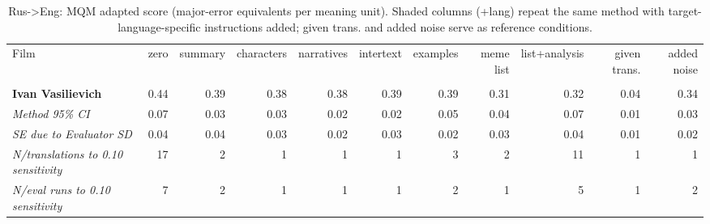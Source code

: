 \begin{table}[ht]
\centering
\begin{adjustbox}{width=\textwidth}
\begin{tabular}{lrrrrrrrr|rr}
Film & zero & summary & characters & narratives & intertext & examples & meme list & list+analysis & \multicolumn{1}{|r}{given trans.} & added noise \\
 &  &  &  &  &  &  &  &  &  &  \\
\hline
\textbf{Ivan Vasilievich} & 0.44 & 0.39 & 0.38 & 0.38 & 0.39 & 0.39 & 0.31 & 0.32 & 0.04 & 0.34 \\

\emph{Method 95\% CI} & 0.07 & 0.03 & 0.03 & 0.02 & 0.02 & 0.05 & 0.04 & 0.07 & 0.01 & 0.03 \\

\emph{SE due to Evaluator SD} & 0.04 & 0.04 & 0.03 & 0.02 & 0.03 & 0.02 & 0.03 & 0.04 & 0.01 & 0.02 \\

\emph{N/translations to 0.10 sensitivity} & 17 & 2 & 1 & 1 & 1 & 3 & 2 & 11 & 1 & 1 \\

\emph{N/eval runs to 0.10 sensitivity} & 7 & 2 & 1 & 1 & 1 & 2 & 1 & 5 & 1 & 2 \\

\hline
\end{tabular}
\end{adjustbox}
\caption{Rus->Eng: MQM adapted score (major-error equivalents per meaning unit). Shaded columns (+lang) repeat the same method with target-language-specific instructions added; given trans. and added noise serve as reference conditions.}
\label{tab:mqm-ivan-vas-eng}
\end{table}
